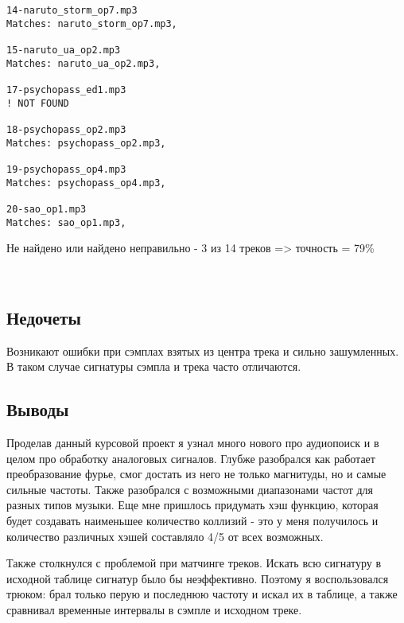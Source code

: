 \documentclass[12pt]{article}
\begin{document}
\begin{itemize}
\begin{lstlisting}
14-naruto_storm_op7.mp3
Matches: naruto_storm_op7.mp3, 

15-naruto_ua_op2.mp3
Matches: naruto_ua_op2.mp3, 

17-psychopass_ed1.mp3
! NOT FOUND

18-psychopass_op2.mp3
Matches: psychopass_op2.mp3, 

19-psychopass_op4.mp3
Matches: psychopass_op4.mp3, 

20-sao_op1.mp3
Matches: sao_op1.mp3, 
        \end{lstlisting}
    Не найдено или найдено неправильно  - 3 из 14 треков => точность = 79\%

    \end{itemize}
 \\ 

    \subsection*{Недочеты}
    Возникают ошибки при сэмплах взятых из центра трека и сильно зашумленных. В таком случае сигнатуры сэмпла и трека часто отличаются.
    
    \subsection*{Выводы}

        Проделав данный курсовой проект я узнал много нового про аудиопоиск и в целом про обработку аналоговых сигналов. Глубже разобрался как работает преобразование фурье, смог достать из него не только магнитуды, но и самые сильные частоты. Также разобрался с возможными диапазонами частот для разных типов музыки. Еще мне пришлось придумать хэш функцию, которая будет создавать наименьшее количество коллизий - это у меня получилось и количество различных хэшей составляло 4/5 от всех возможных.
        
        Также столкнулся с проблемой при матчинге треков. Искать всю сигнатуру в исходной таблице сигнатур было бы неэффективно. Поэтому я воспользовался трюком: брал только перую и последнюю частоту и искал их в таблице, а также сравнивал временные интервалы в сэмпле и исходном треке.
    
\end{document}
